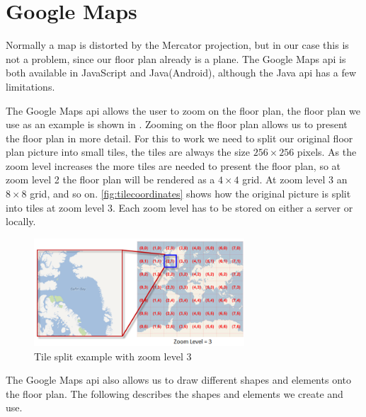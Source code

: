\section{Google Maps}
Normally a map is distorted by the Mercator projection, but in our case this is not a problem, since our floor plan already is a plane. The Google Maps \ac{api} is both available in JavaScript and Java(Android), although the Java \ac{api} has a few limitations.

The Google Maps \ac{api} allows the user to zoom on the floor plan, the floor plan we use as an example is shown in . Zooming on the floor plan allows us to present the floor plan in more detail. For this to work we need to split our original floor plan picture into small tiles, the tiles are always the size $256 \times 256$ pixels. As the zoom level increases the more tiles are needed to present the floor plan, so at zoom level 2 the floor plan will be rendered as a $4 \times 4$ grid. At zoom level 3 an $8 \times 8$ grid, and so on. \autoref{fig:tilecoordinates} shows how the original picture is split into tiles at zoom level 3. Each zoom level has to be stored on either a server or locally.

\begin{figure}[H]
\centering
\includegraphics[width=0.7\textwidth]{img/tilecoordinates2.png}
\caption{Tile split example with zoom level 3 \citep{tilecoordinates}}
\label{fig:tilecoordinates}
\end{figure}

The Google Maps \ac{api} also allows us to draw different shapes and elements onto the floor plan. The following describes the shapes and elements we create and use.%

